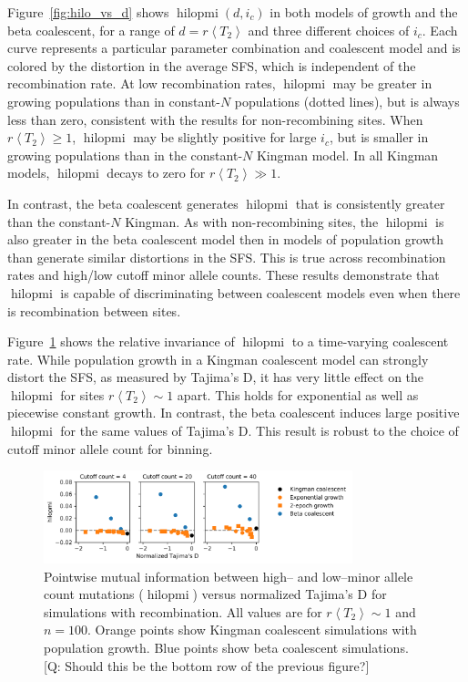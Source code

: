 \documentclass[11pt, letterpaper]{article}   	%
\newcommand{\Fig}[1]{Figure~\ref{#1}}
\newcommand{\E}[1]{\left< #1 \right>}
\DeclareMathOperator{\hilopmi}{hilopmi}
\begin{document}
\Fig{fig:hilo_vs_d} shows $\hilopmi(d,i_c)$ in both models of growth and the beta coalescent, for a range of $d=r\E{T_2}$ and three different choices of $i_c$.
Each curve represents a particular parameter combination and coalescent model and is colored by the distortion in the average SFS, which is independent of the recombination rate.
At low recombination rates, $\hilopmi$ may be greater in growing populations than in constant-$N$ populations (dotted lines), but is always less than zero, consistent with the results for non-recombining sites.
When $r\E{T_2}\geq 1$, $\hilopmi$ may be slightly positive for large $i_c$, but is smaller in growing populations than in the constant-$N$ Kingman model.
In all Kingman models, $\hilopmi$ decays to zero for $r\E{T_2}\gg 1$.

In contrast, the beta coalescent generates $\hilopmi$ that is consistently greater than the constant-$N$ Kingman.
As with non-recombining sites, the $\hilopmi$ is also greater in the beta coalescent model then in models of population growth than generate similar distortions in the SFS.
This is true across recombination rates and high/low cutoff minor allele counts.
These results demonstrate that $\hilopmi$ is capable of discriminating between coalescent models even when there is recombination between sites.

\Fig{fig:hilo_vs_tajD} shows the relative invariance of $\hilopmi$ to a time-varying coalescent rate.
While population growth in a Kingman coalescent model can strongly distort the SFS, as measured by Tajima's D, it has very little effect on the $\hilopmi$ for sites $r \E{T_2} \sim 1$ apart.
This holds for exponential as well as piecewise constant growth.
In contrast, the beta coalescent induces large positive $\hilopmi$ for the same values of Tajima's D.
This result is robust to the choice of cutoff minor allele count for binning.

\begin{figure}
\centering
\includegraphics[width=0.8\textwidth]{figures/hilopmi_vs_tajimasD.pdf}
\caption{Pointwise mutual information between high-- and low--minor allele count mutations ($\hilopmi$) versus normalized Tajima's D for simulations with recombination. All values are for $r \E{T_2} \sim 1$ and $n=100$. Orange points show Kingman coalescent simulations with population growth. Blue points show beta coalescent simulations. [Q: Should this be the bottom row of the previous figure?] \label{fig:hilo_vs_tajD}}
\end{figure}
\end{document}
